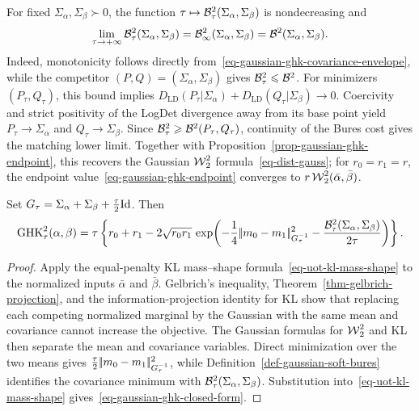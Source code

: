\begin{rem}\label{rem-gaussian-uot-bures-limit}
For fixed $\Sigma_\alpha,\Sigma_\beta\succ0$, the function $\tau\mapsto\mathcal{B}_\tau^2(\Sigma_\alpha,\Sigma_\beta)$ is nondecreasing and
\begin{equation}\label{eq-gaussian-uot-hard-bures-limit}
\lim_{\tau\to+\infty}\mathcal{B}_\tau^2(\Sigma_\alpha,\Sigma_\beta)
=
\mathcal{B}_\infty^2(\Sigma_\alpha,\Sigma_\beta)
=
\mathcal{B}^2(\Sigma_\alpha,\Sigma_\beta).
\end{equation}
Indeed, monotonicity follows directly from~\eqref{eq-gaussian-ghk-covariance-envelope}, while the competitor $(P,Q)=(\Sigma_\alpha,\Sigma_\beta)$ gives $\mathcal{B}_\tau^2\leqslant\mathcal{B}^2$. For minimizers $(P_\tau,Q_\tau)$, this bound implies $D_{\mathrm{LD}}(P_\tau|\Sigma_\alpha)+D_{\mathrm{LD}}(Q_\tau|\Sigma_\beta)\to0$. Coercivity and strict positivity of the LogDet divergence away from its base point yield $P_\tau\to\Sigma_\alpha$ and $Q_\tau\to\Sigma_\beta$. Since $\mathcal{B}_\tau^2\geqslant\mathcal{B}^2(P_\tau,Q_\tau)$, continuity of the Bures cost gives the matching lower limit. Together with Proposition~\ref{prop-gaussian-ghk-endpoint}, this recovers the Gaussian $\operatorname{\mathcal{W}}_2^2$ formula~\eqref{eq-dist-gauss}; for $r_0=r_1=r$, the endpoint value~\eqref{eq-gaussian-ghk-endpoint} converges to $r\operatorname{\mathcal{W}}_2^2(\bar\alpha,\bar\beta)$.
\end{rem}

\begin{prop}\label{prop-gaussian-ghk-endpoint}
Set $G_\tau=\Sigma_\alpha+\Sigma_\beta+\frac{\tau}{2}\mathrm{Id}$. Then
\begin{equation}\label{eq-gaussian-ghk-closed-form}
\operatorname{GHK}_\tau^2(\alpha,\beta)
=
\tau\left\{
r_0+r_1
-2\sqrt{r_0r_1}\,
\exp\!\left(
-\frac14|\!| m_0-m_1 |\!|_{G_\tau^{-1}}^2
-\frac{\mathcal{B}_\tau^2(\Sigma_\alpha,\Sigma_\beta)}{2\tau}
\right)
\right\}.
\end{equation}
\end{prop}

\begin{proof}
Apply the equal-penalty KL mass--shape formula~\eqref{eq-uot-kl-mass-shape} to the normalized inputs $\bar\alpha$ and $\bar\beta$. Gelbrich's inequality, Theorem~\ref{thm-gelbrich-projection}, and the information-projection identity for KL show that replacing each competing normalized marginal by the Gaussian with the same mean and covariance cannot increase the objective. The Gaussian formulas for $\operatorname{\mathcal{W}}_2^2$ and KL then separate the mean and covariance variables. Direct minimization over the two means gives $\frac{\tau}{2}|\!| m_0-m_1 |\!|_{G_\tau^{-1}}^2$, while Definition~\ref{def-gaussian-soft-bures} identifies the covariance minimum with $\mathcal{B}_\tau^2(\Sigma_\alpha,\Sigma_\beta)$. Substitution into~\eqref{eq-uot-kl-mass-shape} gives~\eqref{eq-gaussian-ghk-closed-form}.
\end{proof}

